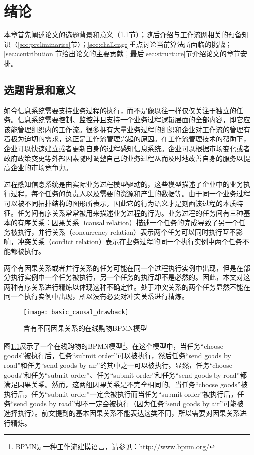 \chapter{绪论}\label{cha:intro}
本章首先阐述论文的选题背景和意义（\ref{sec:background}节）；随后介绍与工作流网相关的预备知识（\ref{sec:preliminaries}节）；\ref{sec:challenge}重点讨论当前算法所面临的挑战；\ref{sec:contribution}节给出论文的主要贡献；最后\ref{sec:structure}节介绍论文的章节安排。

\section{选题背景和意义}\label{sec:background}
如今信息系统需要支持业务过程的执行，而不是像以往一样仅仅关注于独立的任务。信息系统需要控制、监控并且支持一个业务过程逻辑层面的全部内容，即它应该能管理组织内的工作流。很多拥有大量业务过程的组织和企业对工作流的管理有着极为迫切的需求，这正是工作流管理兴起的原因\cite{van1998application}。在工作流管理技术的帮助下，企业可以快速建立或者更新自身的过程感知信息系统\cite{dumas2005process}。企业可以根据市场变化或者政府政策变更等外部因素随时调整自己的业务过程从而及时地改善自身的服务以提高企业的市场竞争力。

过程感知信息系统是由实际业务过程模型驱动的，这些模型描述了企业中的业务执行过程，每个任务的负责人以及需要的资源和产生的数据等。由于同一个业务过程可以被不同拓扑结构的图形所表示，因此它的行为语义才是刻画该过程的本质特征。任务间有序关系\cite{esparza2002improvement}常常被用来描述业务过程的行为。业务过程的任务间有三种基本的有序关系：因果关系（causal relation）描述一个任务的完成导致了另一个任务被执行，并行关系（concurrency relation）表示两个任务可以同时执行互不影响，冲突关系（conflict relation）表示在业务过程的同一个执行实例中两个任务不能都被执行。

两个有因果关系或者并行关系的任务可能在同一个过程执行实例中出现，但是在部分执行实例中一个任务被执行，另一个任务的执行却不是必然的。因此，本文对这两种有序关系进行精炼以体现这种不确定性。处于冲突关系的两个任务显然不能在同一个执行实例中出现，所以没有必要对冲突关系进行精炼。

\begin{figure}[htbp]
  \centering
  \texttt{[image: basic\_causal\_drawback]}
  \caption{含有不同因果关系的在线购物BPMN模型\label{fig:basic_causal_drawback}}
\end{figure}

\begin{example}\label{ex:basic_causal_drawback}
图\ref{fig:basic_causal_drawback}展示了一个在线购物的BPMN模型\footnote{BPMN是一种工作流建模语言，请参见：http://www.bpmn.org/}。在这个模型中，当任务“choose goods”被执行后，任务“submit order”可以被执行，然后任务“send goods by road”和任务“send goods by air”的其中之一可以被执行。显然，任务“choose goods”和任务“submit order”、任务“submit order”和任务“send goods by road”都满足因果关系。然而，这两组因果关系是不完全相同的。当任务“choose goods”被执行后，任务“submit order”一定会被执行而当任务“submit order”被执行后，任务“send goods by road”却不一定会被执行（因为任务“send goods by air”可能被选择执行）。前文提到的基本因果关系不能表达这类不同，所以需要对因果关系进行精炼。
\end{example}

